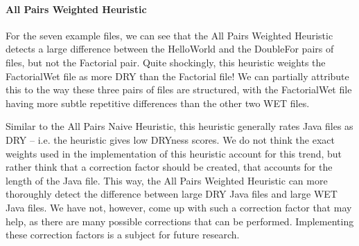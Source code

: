 \documentclass{article}
\begin{document}
\paragraph{All Pairs Weighted Heuristic}
For the seven example files, we can see that the All Pairs Weighted Heuristic detects a large difference between the HelloWorld and the DoubleFor pairs of files, but not the Factorial pair. Quite shockingly, this heuristic weights the FactorialWet file as more DRY than the Factorial file! We can partially attribute this to the way these three pairs of files are structured, with the FactorialWet file having more subtle repetitive differences than the other two WET files.

Similar to the All Pairs Naive Heuristic, this heuristic generally rates Java files as DRY -- i.e. the heuristic gives low DRYness scores.
We do not think the exact weights used in the implementation of this heuristic account for this trend, but rather think that a
correction factor should be created, that accounts for the length of the Java file. This way, the All Pairs Weighted Heuristic can
more thoroughly detect the difference between large DRY Java files and large WET Java files. We have not, however, come up with 
such a correction factor that may help, as there are many possible corrections that can be performed. Implementing these correction
factors is a subject for future research.
\end{document}
